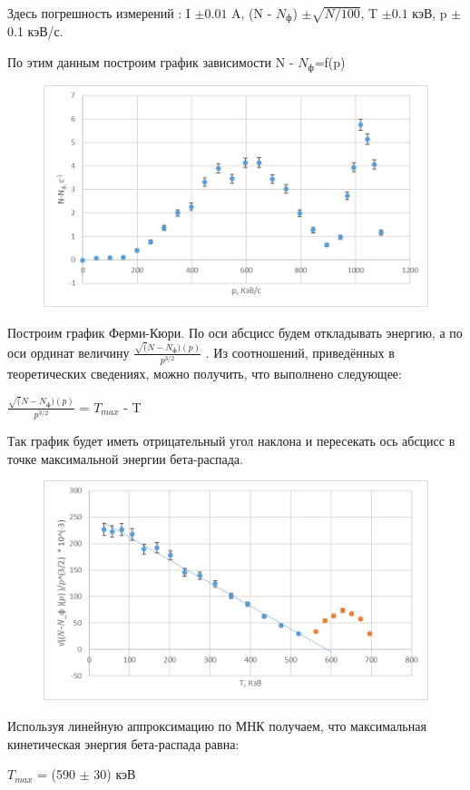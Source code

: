 \documentclass[12pt,a4paper]{article}
\begin{document}
Здесь погрешность измерений : I $\pm 0.01$ A, (N - $N_\text{ф}$) $\pm \sqrt{N / 100}$, T $\pm 0.1$ кэВ, p $\pm$ 0.1 кэВ/с.   

По этим данным построим график зависимости N - $N_\text{ф}$=f(p)

\begin{figure}[H]
\includegraphics[scale = 0.7]{5.4.2-4}
\centering
\end{figure}

	Построим график Ферми-Кюри. По оси абсцисс будем откладывать энергию, а по оси ординат величину $\frac{\sqrt(N - N_\text{ф})(p)}{p^{3/2}}$ . Из соотношений, приведённых в теоретических сведениях, можно получить, что выполнено следующее:
\begin{center}
$\frac{\sqrt(N - N_\text{ф})(p)}{p^{3/2}}$ = $T_{max}$ - T
\end{center}	

 Так график будет иметь отрицательный угол наклона и пересекать ось абсцисс в точке максимальной энергии бета-распада.
     
   \begin{figure}[H]
\includegraphics[scale = 0.7]{5.4.2-5}
\centering
\end{figure}  

Используя линейную аппроксимацию по МНК получаем, что максимальная кинетическая энергия бета-распада равна:
\begin{center}
$T_{max}$ = (590 $\pm$ 30) кэВ
\end{center}
\end{document}
